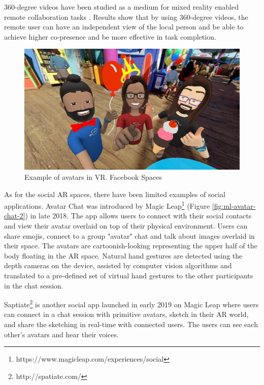 360-degree videos have been studied as a medium for mixed reality enabled remote collaboration tasks \cite{Tang2017a, Lee2017, lee2017mixed, Lee2019}. Results show that by using 360-degree videos, the remote user can have an independent view of the local person and be able to achieve higher co-presence and be more effective in task completion. 

\begin{figure}
    \centering
    \includegraphics[width=0.8\linewidth]{images/20-background/facebook-spaces.eps}
    \caption{Example of avatars in VR. Facebook Spaces}
    \label{fig:facebook-spaces}
\end{figure}

As for the social AR spaces, there have been limited examples of social applications. Avatar Chat was introduced by Magic Leap\footnote{https://www.magicleap.com/experiences/social} (Figure \ref{fig:ml-avatar-chat-2}) in late 2018. The app allows users to connect with their social contacts and view their avatar overlaid on top of their physical environment. Users can share emojis, connect to a group "avatar" chat and talk about images overlaid in their space. The avatars are cartoonish-looking representing the upper half of the body floating in the AR space. Natural hand gestures are detected using the depth cameras on the device, assisted by computer vision algorithms and translated to a pre-defined set of virtual hand gestures to the other participants in the chat session. 

Saptiate\footnote{http://spatiate.com/} is another social app launched in early 2019 on Magic Leap where users can connect in a chat session with primitive avatars, sketch in their AR world, and share the sketching in real-time with connected users. The users can see each other's avatars and hear their voices. 

